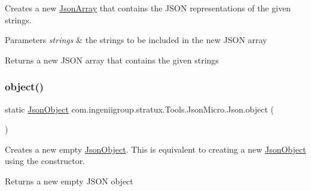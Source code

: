 Creates a new \hyperlink{classcom_1_1ingeniigroup_1_1stratux_1_1_tools_1_1_json_micro_1_1_json_array}{Json\+Array} that contains the J\+S\+ON representations of the given strings.


\begin{DoxyParams}{Parameters}
{\em strings} & the strings to be included in the new J\+S\+ON array \\
\hline
\end{DoxyParams}
\begin{DoxyReturn}{Returns}
a new J\+S\+ON array that contains the given strings 
\end{DoxyReturn}
\mbox{\label{classcom_1_1ingeniigroup_1_1stratux_1_1_tools_1_1_json_micro_1_1_json_af00c51eafc3d4e8f87ce07660acfbaae}} 
\subsubsection{\texorpdfstring{object()}{object()}}
{\footnotesize\ttfamily static \hyperlink{classcom_1_1ingeniigroup_1_1stratux_1_1_tools_1_1_json_micro_1_1_json_object}{Json\+Object} com.\+ingeniigroup.\+stratux.\+Tools.\+Json\+Micro.\+Json.\+object (\begin{DoxyParamCaption}{ }\end{DoxyParamCaption})\hspace{0.3cm}{\ttfamily [static]}}

Creates a new empty \hyperlink{classcom_1_1ingeniigroup_1_1stratux_1_1_tools_1_1_json_micro_1_1_json_object}{Json\+Object}. This is equivalent to creating a new \hyperlink{classcom_1_1ingeniigroup_1_1stratux_1_1_tools_1_1_json_micro_1_1_json_object}{Json\+Object} using the constructor.

\begin{DoxyReturn}{Returns}
a new empty J\+S\+ON object 
\end{DoxyReturn}
\mbox{\label{classcom_1_1ingeniigroup_1_1stratux_1_1_tools_1_1_json_micro_1_1_json_a0d4456dc115b1540337d2475ed2e3d55}} 
